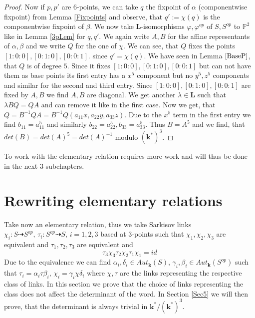 \documentclass[12pt, oneside, reqno]{amsart}
\begin{document}
\begin{proof}
    Now if $p,p'$ are $6$-points, we can take $q$ the fixpoint of $\alpha$ (componentwise fixpoint) from Lemma \ref{Fixpoints} and observe, that $q' := \chi(q)$ is the componentwise fixpoint of $\beta$. We now take $\textbf{L}$-isomorphisms $\varphi, \varphi^{op}$ of $S,S^{op}$ to $\mathbb{P}^2$ like in Lemma \ref{3pLem} for $q,q'$. We again write $A,B$ for the affine representants of $\alpha, \beta$ and we write $Q$ for the one of $\chi$. We can see, that $Q$ fixes the points $[1:0:0], [0:1:0],[0:0:1]$. since $q' = \chi(q)$. We have seen in Lemma $\ref{BaseP}$, that $Q$ is of degree $5$. Since it fixes $[1:0:0], [0:1:0],[0:0:1]$ but can not have them as base points its first entry has a $x^5$ component but no $y^5,z^5$ components and similar for the second and third entry. Since $[1:0:0], [0:1:0],[0:0:1]$ are fixed by $A,B$ we find $A,B$ are diagonal. We get another $\lambda \in \textbf{L}$ such that $\lambda B Q = Q A$ and can remove it like in the first case. Now we get, that $Q = B^{-1}Q A = B^{-1}Q(a_{11}x, a_{22}y, a_{33}z)$. Due to the $x^5$ term in the first entry we find $b_{11} = a_{11}^5$ and similarly $b_{22} = a_{22}^5, b_{33} = a_{33}^5$. Thus $B = A^5$ and we find, that $det(B) = det(A)^5 = det(A)^{-1}$ modulo $(\textbf{k}^*)^3$.
\end{proof}
\noindent
To work with the elementary relation requires more work and will thus be done in the next $3$ subchapters. 


 

\section{Rewriting elementary relations}
 \noindent Take now an elementary relation, thus we take Sarkisov links $\chi_i: S \dashrightarrow S^{op}, \, \tau_i: S^{op} \dashrightarrow S, \, i=1,2,3$ based at $3$-points such that $\chi_1,\chi_2,\chi_3$ are equivalent and $\tau_1,\tau_2,\tau_3$ are equivalent and \[\tau_3\chi_3\tau_2\chi_2\tau_1\chi_1 = id\] Due to the equivalence we can find $\alpha_i, \delta_i \in Aut_{\textbf{k}}(S), \, \gamma_i, \beta_i \in Aut_{\textbf{k}}(S^{op})$ such that $\tau_i = \alpha_i \tau \beta_i, \, \chi_i = \gamma_i \chi \delta_i$ where $\chi, \tau$ are the links representing the respective class of links. In this section we prove that the choice of links representing the class does not affect the determinant of the word. In Section \ref{Sec5} we will then prove, that the determinant is always trivial in $\textbf{k}^*/(\textbf{k}^*)^3$.
\end{document}
